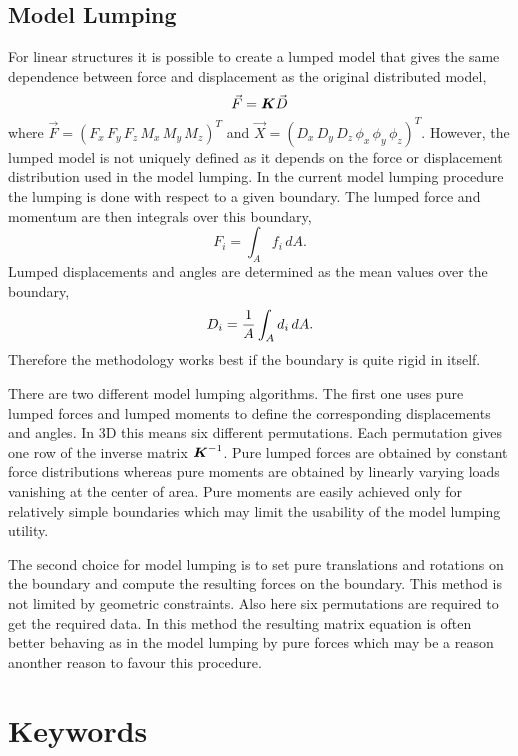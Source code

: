 \subsection{Model Lumping}

For linear structures it is possible to create a lumped model that gives the same
dependence between force and displacement as the original distributed model,
\begin{equation}
  \Vec{F} = {\mbox{\boldmath{${K}$}}} \Vec{D}
\end{equation}
where $\Vec{F}=(F_x\,F_y\,F_z\,M_x\,M_y\,M_z)^T$ and 
$\Vec{X} = (D_x\,D_y\,D_z\,\phi_x\,\phi_y\,\phi_z)^T$. 
However, the lumped model is not uniquely defined as it depends on the force or displacement distribution
used in the model lumping. In the current model lumping procedure the 
lumping is done with respect to a given boundary. 
The lumped force and momentum are
then integrals over this boundary,
\begin{equation}
  F_i = \int_A f_i \, dA .
\end{equation}
Lumped displacements and angles are determined
as the mean values over the boundary, 
\begin{equation}
  D_i = \frac{1}{A} \int_A d_i \, dA.
\end{equation}
Therefore the methodology works best if the 
boundary is quite rigid in itself. 

There are two different model lumping algorithms.
The first one uses 
pure lumped forces and lumped moments to define the corresponding
displacements and angles. In 3D this means six different permutations. 
Each permutation gives one row of the inverse matrix ${\mbox{\boldmath{${K}$}}}^{-1}$.
Pure lumped forces are obtained by constant force distributions whereas
pure moments are obtained by linearly varying loads vanishing at the 
center of area. Pure moments are easily achieved only for relatively simple 
boundaries which may limit the usability of the model lumping utility.

The second choice for model lumping is to set pure translations and rotations
on the boundary and compute the resulting forces on the boundary. This method is not 
limited by geometric constraints. Also here six permutations are required to 
get the required data. In this method the resulting matrix equation is often better 
behaving as in the model lumping by pure forces which may be a reason anonther reason
to favour this procedure. 

\section{Keywords} 

